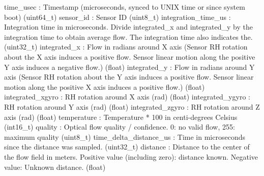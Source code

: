 \begin{DoxyVerb}
\begin{DoxyVerb}
\begin{DoxyVerb}
time_usec                 : Timestamp (microseconds, synced to UNIX time or since system boot) (uint64_t)
sensor_id                 : Sensor ID (uint8_t)
integration_time_us        : Integration time in microseconds. Divide integrated_x and integrated_y by the integration time to obtain average flow. The integration time also indicates the. (uint32_t)
integrated_x              : Flow in radians around X axis (Sensor RH rotation about the X axis induces a positive flow. Sensor linear motion along the positive Y axis induces a negative flow.) (float)
integrated_y              : Flow in radians around Y axis (Sensor RH rotation about the Y axis induces a positive flow. Sensor linear motion along the positive X axis induces a positive flow.) (float)
integrated_xgyro          : RH rotation around X axis (rad) (float)
integrated_ygyro          : RH rotation around Y axis (rad) (float)
integrated_zgyro          : RH rotation around Z axis (rad) (float)
temperature               : Temperature * 100 in centi-degrees Celsius (int16_t)
quality                   : Optical flow quality / confidence. 0: no valid flow, 255: maximum quality (uint8_t)
time_delta_distance_us        : Time in microseconds since the distance was sampled. (uint32_t)
distance                  : Distance to the center of the flow field in meters. Positive value (including zero): distance known. Negative value: Unknown distance. (float)\end{DoxyVerb}
 \mbox{\label{classpymavlink_1_1dialects_1_1v10_1_1MAVLink_a97d8e8552503da0aef7573b0375b24fa}} 

\end{DoxyVerb}
\end{DoxyVerb}

